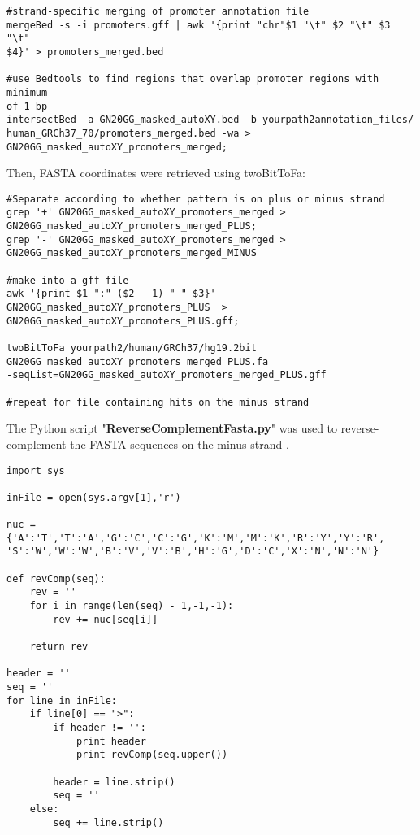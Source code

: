 \begin{footnotesize}
\begin{lstlisting}
#strand-specific merging of promoter annotation file
mergeBed -s -i promoters.gff | awk '{print "chr"$1 "\t" $2 "\t" $3 "\t"
$4}' > promoters_merged.bed 

#use Bedtools to find regions that overlap promoter regions with minimum 
of 1 bp 
intersectBed -a GN20GG_masked_autoXY.bed -b yourpath2annotation_files/
human_GRCh37_70/promoters_merged.bed -wa >
GN20GG_masked_autoXY_promoters_merged;
\end{lstlisting}

Then, FASTA coordinates were retrieved using twoBitToFa:

\begin{lstlisting}
#Separate according to whether pattern is on plus or minus strand
grep '+' GN20GG_masked_autoXY_promoters_merged >
GN20GG_masked_autoXY_promoters_merged_PLUS; 
grep '-' GN20GG_masked_autoXY_promoters_merged >
GN20GG_masked_autoXY_promoters_merged_MINUS 

#make into a gff file
awk '{print $1 ":" ($2 - 1) "-" $3}' GN20GG_masked_autoXY_promoters_PLUS  >
GN20GG_masked_autoXY_promoters_PLUS.gff;

twoBitToFa yourpath2/human/GRCh37/hg19.2bit
GN20GG_masked_autoXY_promoters_merged_PLUS.fa 
-seqList=GN20GG_masked_autoXY_promoters_merged_PLUS.gff 

#repeat for file containing hits on the minus strand
\end{lstlisting}


The Python script "\textbf{ReverseComplementFasta.py}" was used to reverse-complement the FASTA sequences on the minus strand \cite{Kao:Online}.

\begin{lstlisting}
import sys

inFile = open(sys.argv[1],'r')

nuc = {'A':'T','T':'A','G':'C','C':'G','K':'M','M':'K','R':'Y','Y':'R',
'S':'W','W':'W','B':'V','V':'B','H':'G','D':'C','X':'N','N':'N'}

def revComp(seq):
    rev = ''
    for i in range(len(seq) - 1,-1,-1):
        rev += nuc[seq[i]]

    return rev

header = ''
seq = ''
for line in inFile:
    if line[0] == ">":
        if header != '':
            print header
            print revComp(seq.upper())

        header = line.strip()
        seq = ''
    else:
        seq += line.strip()


\end{lstlisting}
\end{footnotesize}
